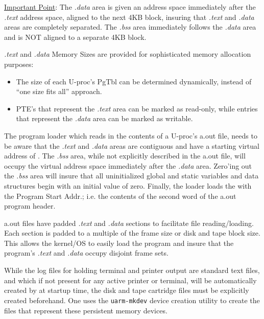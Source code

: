 
\uline{Important Point}: The \emph{.data} area is given an address space immediately after the \emph{.text} address space, aligned to the next 4KB block, insuring that \emph{.text} and \emph{.data} areas are completely separated.
The \emph{.bss} area immediately follows the \emph{.data} area and is NOT aligned to a separate 4KB block.

\emph{.text} and \emph{.data} Memory Sizes are provided for sophisticated memory allocation purposes:
\begin{itemize}
	\item The size of each U-proc’s PgTbl can be determined dynamically, instead of “one size fits all” approach.
	\item PTE’s that represent the \emph{.text} area can be marked as read-only, while entries that represent the \emph{.data} area can be marked as writable.
\end{itemize}

The program loader which reads in the contents of a U-proc’s a.out file, needs to be aware that the \emph{.text} and \emph{.data} areas are contiguous and have a starting virtual address of . 
The \emph{.bss} area, while not explicitly described in the a.out file, will occupy the virtual address space immediately after the \emph{.data} area. 
Zero’ing out the \emph{.bss} area will insure that all uninitialized global and static variables and data structures begin with an initial value of zero. 
Finally, the loader loads the  with the Program Start Addr.; i.e. the contents of the second word of the a.out program header.

a.out files have padded \emph{.text} and \emph{.data} sections to facilitate file reading/loading.
Each section is padded to a multiple of the frame size or disk and tape block size.
This allows the kernel/OS to easily load the program and insure that the program’s \emph{.text} and \emph{.data} occupy disjoint frame sets.

\label{sec:man:mkdev}

While the log files for holding terminal and printer output are standard text files, and which if not present for any active printer or terminal, will be automatically created by \uarm{} at startup time, the disk and tape cartridge files must be explicitly created beforehand. 
One uses the \texttt{uarm-mkdev} device creation utility to create the files that represent these persistent memory devices.

